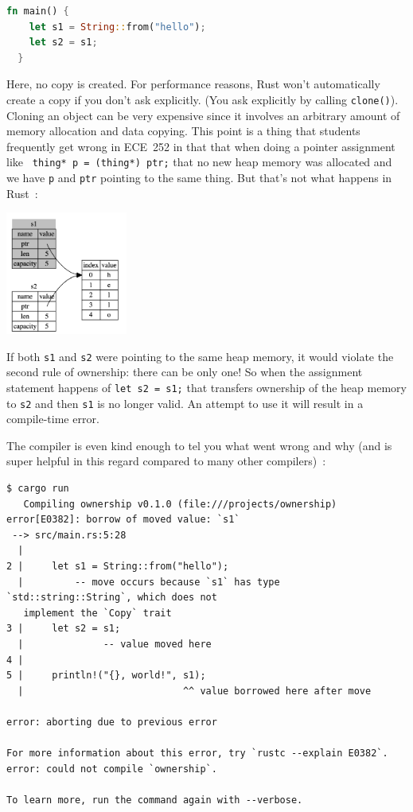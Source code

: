 \begin{lstlisting}[language=Rust]
  fn main() {
    let s1 = String::from("hello");
    let s2 = s1;
  }
\end{lstlisting}

Here, no copy is created. For performance reasons, Rust won't automatically create a copy if you don't ask explicitly. (You ask explicitly by calling \texttt{clone()}). Cloning an object can be very expensive since it involves an arbitrary amount of memory allocation and data copying. This point is a thing that students frequently get wrong in ECE~252 in that that when doing a pointer assignment like \texttt{ thing* p = (thing*) ptr;} that no new heap memory was allocated and we have \texttt{p} and \texttt{ptr} pointing to the same thing. But that's not what happens in Rust~\cite{rustdocs}:

\begin{center}
\includegraphics[width=0.3\textwidth]{images/string-rust.png}
\end{center}

If both \texttt{s1} and \texttt{s2} were pointing to the same heap memory, it would violate the second rule of ownership: there can be only one! So when the assignment statement happens of \texttt{let s2 = s1;} that transfers ownership of the heap memory to \texttt{s2} and then \texttt{s1} is no longer valid. An attempt to use it will result in a compile-time error. 


The compiler is even kind enough to tel you what went wrong and why (and is super helpful in this regard compared to many other compilers)~\cite{rustdocs}:
\begin{verbatim}
$ cargo run
   Compiling ownership v0.1.0 (file:///projects/ownership)
error[E0382]: borrow of moved value: `s1`
 --> src/main.rs:5:28
  |
2 |     let s1 = String::from("hello");
  |         -- move occurs because `s1` has type `std::string::String`, which does not
   implement the `Copy` trait
3 |     let s2 = s1;
  |              -- value moved here
4 | 
5 |     println!("{}, world!", s1);
  |                            ^^ value borrowed here after move

error: aborting due to previous error

For more information about this error, try `rustc --explain E0382`.
error: could not compile `ownership`.

To learn more, run the command again with --verbose.
\end{verbatim}

